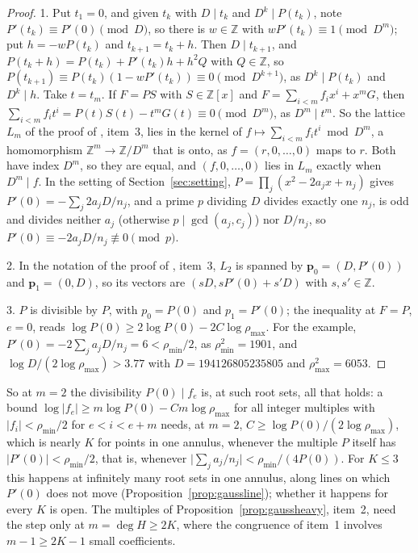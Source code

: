 \documentclass[11pt]{article}
\begin{document}
\begin{proof}
1.  Put $t_1=0$, and given $t_k$ with $D\mid t_k$ and $D^k\mid P(t_k)$, note
$P'(t_k)\equiv P'(0)\pmod D$, so there is $w\in\mathbb Z$ with
$wP'(t_k)\equiv1\pmod{D^m}$; put $h=-wP(t_k)$ and $t_{k+1}=t_k+h$.  Then
$D\mid t_{k+1}$, and $P(t_k+h)=P(t_k)+P'(t_k)h+h^2Q$ with $Q\in\mathbb Z$,
so $P(t_{k+1})\equiv P(t_k)(1-wP'(t_k))\equiv0\pmod{D^{k+1}}$, as
$D^k\mid P(t_k)$ and $D^k\mid h$.  Take $t=t_m$.  If $F=PS$ with
$S\in\mathbb Z[x]$ and $F=\sum_{i<m}f_ix^i+x^mG$, then
$\sum_{i<m}f_it^i=P(t)S(t)-t^mG(t)\equiv0\pmod{D^m}$, as $D^m\mid t^m$.  So
the lattice $L_m$ of the proof of \cite[Proposition~5.4]{coefficient-mass-sectors}, item~3,
lies in the kernel of $f\mapsto\sum_{i<m}f_it^i\bmod D^m$, a homomorphism
$\mathbb Z^m\to\mathbb Z/D^m$ that is onto, as $f=(r,0,\ldots,0)$ maps to
$r$.  Both have index $D^m$, so they are equal, and $(f,0,\ldots,0)$ lies in
$L_m$ exactly when $D^m\mid f$.  In the setting of Section~\ref{sec:setting},
$P=\prod_j(x^2-2a_jx+n_j)$ gives $P'(0)=-\sum_j2a_jD/n_j$, and a prime $p$
dividing $D$ divides exactly one $n_j$, is odd and divides neither $a_j$
(otherwise $p\mid\gcd(a_j,c_j)$) nor $D/n_j$, so
$P'(0)\equiv-2a_jD/n_j\not\equiv0\pmod p$.

2.  In the notation of the proof of \cite[Proposition~5.4]{coefficient-mass-sectors}, item~3,
$L_2$ is spanned by $\mathbf p_0=(D,P'(0))$ and $\mathbf p_1=(0,D)$, so its
vectors are $(sD,sP'(0)+s'D)$ with $s,s'\in\mathbb Z$.

3.  $P$ is divisible by $P$, with $p_0=P(0)$ and $p_1=P'(0)$; the inequality
at $F=P$, $e=0$, reads $\log P(0)\ge2\log P(0)-2C\log\rho_{\max}$.  For the
example, $P'(0)=-2\sum_ja_jD/n_j=6<\rho_{\min}/2$, as $\rho_{\min}^2=1901$,
and $\log D/(2\log\rho_{\max})>3.77$ with $D=194126805235805$ and
$\rho_{\max}^2=6053$.
\end{proof}

So at $m=2$ the divisibility $P(0)\mid f_e$ is, at such root sets, all that
holds: a bound $\log|f_e|\ge m\log P(0)-Cm\log\rho_{\max}$ for all
integer multiples with $|f_i|<\rho_{\min}/2$ for $e<i<e+m$ needs, at $m=2$,
$C\ge\log P(0)/(2\log\rho_{\max})$, which is nearly $K$ for points in one
annulus, whenever the multiple $P$ itself has $|P'(0)|<\rho_{\min}/2$, that
is, whenever $\bigl|\sum_ja_j/n_j\bigr|<\rho_{\min}/(4P(0))$.  For $K\le3$
this happens at infinitely many root sets in one annulus, along lines on
which $P'(0)$ does not move (Proposition~\ref{prop:gaussline}); whether it
happens for every $K$ is open.  The multiples of
Proposition~\ref{prop:gaussheavy}, item~2, need the step only at
$m=\deg H\ge2K$, where the congruence of item~1 involves $m-1\ge2K-1$ small
coefficients.
\end{document}

